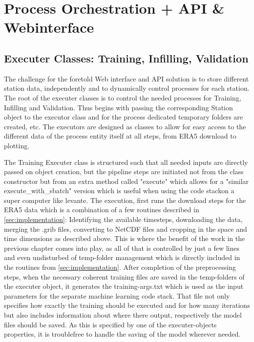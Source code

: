 
\section{Process Orchestration + API \& Webinterface}
\label{sec:process_orchestration}

\subsection{Executer Classes: Training, Infilling, Validation}

The challenge for the foretold Web interface and API solution is to store different station data, independently and to dynamically control processes for each station. The root of the executer classes is to control the needed processes for Training, Infilling and Validation. Thus begins with passing the corresponding Station object to the executor class and for the process dedicated temporary folders are created, etc. The executors are designed as classes to allow for easy access to the different data of the process entity itself at all steps, from ERA5 download to plotting.

The Training Executer class is structured such that all needed inputs are directly passed on object creation, but the pipeline steps are initiated not from the class constructor but from an extra method called "execute" which allows for a "similar execute\_with\_sbatch" version which is useful when using the code stackon a super computer like levante.
The execution, first runs the download steps for the ERA5 data which is a combination of a few routines described in \autoref{sec:implementation}: Identifying the available timesteps, downloading the data, merging the .grib files, converting to NetCDF files and cropping in the space and time dimensions as described above. This is where the benefit of the work in the previous chapter comes into play, as all of that is controlled by just a few lines and even undisturbed of temp-folder management which is directly included in the routines from \autoref{sec:implementation}.
After completion of the preprocessing steps, when the necessary coherent training files are saved in the temp-folders of the executer object, it generates the training-args.txt which is used as the input parameters for the separate machine learning code stack. That file not only specifies how exactly the training should be executed and for how many iterations but also includes information about where there output, respectively the model files should be saved. As this is specified by one of the executer-objects properties, it is troublefree to handle the saving of the model wherever needed.

